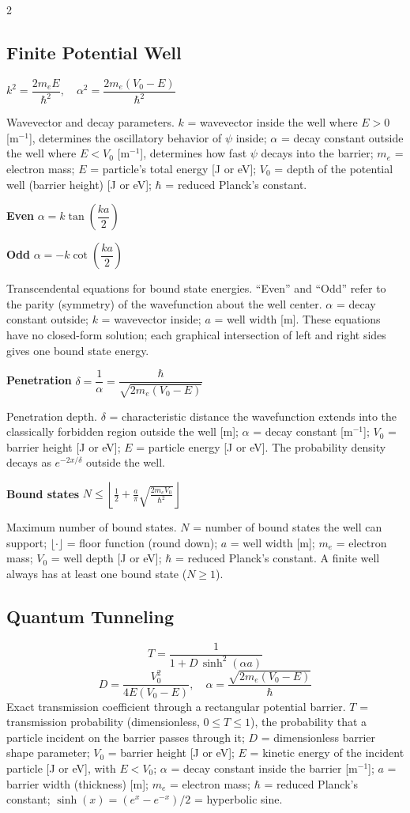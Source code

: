 \documentclass[9pt]{extarticle}
\newcommand{\eqlabel}[1]{\textbf{\scriptsize #1}\;}
\newcommand{\desc}[1]{{\small\color{desc}#1}}
\begin{document}
\begin{multicols}{2}
\subsection{Finite Potential Well}
$k^2 = \dfrac{2m_eE}{\hbar^2},\quad \alpha^2 = \dfrac{2m_e(V_0-E)}{\hbar^2}$

\desc{Wavevector and decay parameters. $k$ = wavevector inside the well where $E > 0$ [m$^{-1}$], determines the oscillatory behavior of $\psi$ inside; $\alpha$ = decay constant outside the well where $E < V_0$ [m$^{-1}$], determines how fast $\psi$ decays into the barrier; $m_e$ = electron mass; $E$ = particle's total energy [J or eV]; $V_0$ = depth of the potential well (barrier height) [J or eV]; $\hbar$ = reduced Planck's constant.}

\eqlabel{Even} $\alpha = k\tan\!\left(\dfrac{ka}{2}\right)$

\eqlabel{Odd} $\alpha = -k\cot\!\left(\dfrac{ka}{2}\right)$

\desc{Transcendental equations for bound state energies. ``Even'' and ``Odd'' refer to the parity (symmetry) of the wavefunction about the well center. $\alpha$ = decay constant outside; $k$ = wavevector inside; $a$ = well width [m]. These equations have no closed-form solution; each graphical intersection of left and right sides gives one bound state energy.}

\eqlabel{Penetration} $\delta = \dfrac{1}{\alpha} = \dfrac{\hbar}{\sqrt{2m_e(V_0 - E)}}$

\desc{Penetration depth. $\delta$ = characteristic distance the wavefunction extends into the classically forbidden region outside the well [m]; $\alpha$ = decay constant [m$^{-1}$]; $V_0$ = barrier height [J or eV]; $E$ = particle energy [J or eV]. The probability density decays as $e^{-2x/\delta}$ outside the well.}

\eqlabel{Bound states} $N \leq \left\lfloor \tfrac{1}{2} + \tfrac{a}{\pi}\sqrt{\tfrac{2m_eV_0}{\hbar^2}}\right\rfloor$

\desc{Maximum number of bound states. $N$ = number of bound states the well can support; $\lfloor\cdot\rfloor$ = floor function (round down); $a$ = well width [m]; $m_e$ = electron mass; $V_0$ = well depth [J or eV]; $\hbar$ = reduced Planck's constant. A finite well always has at least one bound state ($N \geq 1$).}

\subsection{Quantum Tunneling}
\[T = \frac{1}{1 + D\,\sinh^2(\alpha a)}\]
\[D = \frac{V_0^2}{4E(V_0-E)},\quad \alpha = \frac{\sqrt{2m_e(V_0-E)}}{\hbar}\]
\desc{Exact transmission coefficient through a rectangular potential barrier. $T$ = transmission probability (dimensionless, $0 \leq T \leq 1$), the probability that a particle incident on the barrier passes through it; $D$ = dimensionless barrier shape parameter; $V_0$ = barrier height [J or eV]; $E$ = kinetic energy of the incident particle [J or eV], with $E < V_0$; $\alpha$ = decay constant inside the barrier [m$^{-1}$]; $a$ = barrier width (thickness) [m]; $m_e$ = electron mass; $\hbar$ = reduced Planck's constant; $\sinh(x) = (e^x - e^{-x})/2$ = hyperbolic sine.}


\end{multicols}
\end{document}
